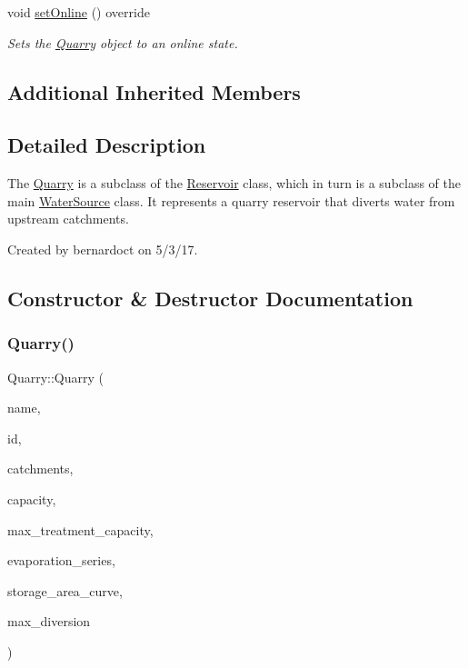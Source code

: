 \begin{DoxyCompactItemize}
void \mbox{\hyperlink{classQuarry_af5fe04fa188d399485b2b4e64381e169}{set\+Online}} () override
\begin{DoxyCompactList}\small\item\em Sets the \mbox{\hyperlink{classQuarry}{Quarry}} object to an online state. \end{DoxyCompactList}\end{DoxyCompactItemize}
\subsection*{Additional Inherited Members}


\subsection{Detailed Description}
The {\ttfamily \mbox{\hyperlink{classQuarry}{Quarry}}} is a subclass of the {\ttfamily \mbox{\hyperlink{classReservoir}{Reservoir}}} class, which in turn is a subclass of the main {\ttfamily \mbox{\hyperlink{classWaterSource}{Water\+Source}}} class. It represents a quarry reservoir that diverts water from upstream catchments. 

Created by bernardoct on 5/3/17. 

\subsection{Constructor \& Destructor Documentation}
\mbox{\label{classQuarry_a126fddda9e5deeb667a6a9dbb0533470}} 
\subsubsection{\texorpdfstring{Quarry()}{Quarry()}\hspace{0.1cm}{\footnotesize\ttfamily [1/5]}}
{\footnotesize\ttfamily Quarry\+::\+Quarry (\begin{DoxyParamCaption}\item[{const char $\ast$}]{name,  }\item[{const int}]{id,  }\item[{const vector$<$ \mbox{\hyperlink{classCatchment}{Catchment}} $\ast$$>$ \&}]{catchments,  }\item[{const double}]{capacity,  }\item[{const double}]{max\+\_\+treatment\+\_\+capacity,  }\item[{\mbox{\hyperlink{classEvaporationSeries}{Evaporation\+Series}} \&}]{evaporation\+\_\+series,  }\item[{\mbox{\hyperlink{classDataSeries}{Data\+Series}} $\ast$}]{storage\+\_\+area\+\_\+curve,  }\item[{double}]{max\+\_\+diversion }\end{DoxyParamCaption})}



